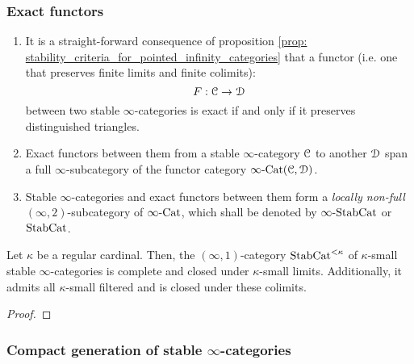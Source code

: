         \subsubsection{Exact functors}
            \begin{remark} \label{remark: functors_between_stable_infinity_categories}  
                \noindent
                \begin{enumerate}
                    \item It is a straight-forward consequence of proposition \ref{prop: stability_criteria_for_pointed_infinity_categories} that a functor (i.e. one that preserves finite limits and finite colimits):
                        $$F: \mathcal{C} \to \mathcal{D}$$
                    between two stable $\infty$-categories is exact if and only if it preserves distinguished triangles.
                    \item Exact functors between them from a stable $\infty$-category $\mathcal{C}$ to another $\mathcal{D}$ span a full $\infty$-subcategory of the functor category $\infty\text{-}\mathrm{Cat}(\mathcal{C}, \mathcal{D})$.
                    \item Stable $\infty$-categories and exact functors between them form a \textit{locally non-full} $(\infty, 2)$-subcategory of $\infty\text{-}\mathrm{Cat}$, which shall be denoted by $\infty\text{-}\mathrm{Stab}\mathrm{Cat}$ or $\mathrm{Stab}\mathrm{Cat}$. 
                \end{enumerate}
            \end{remark}
            
            \begin{proposition} \label{prop: (co)limits_of_stable_infinity_categories}  
                Let $\kappa$ be a regular cardinal. Then, the $(\infty, 1)$-category $\mathrm{Stab}\mathrm{Cat}^{< \kappa}$ of $\kappa$-small stable $\infty$-categories is complete and closed under $\kappa$-small limits. Additionally, it admits all $\kappa$-small filtered and is closed under these colimits. 
            \end{proposition}
                \begin{proof}
                    
                \end{proof}
                
        \subsubsection{Compact generation of stable \texorpdfstring{$\infty$}{}-categories}
                
